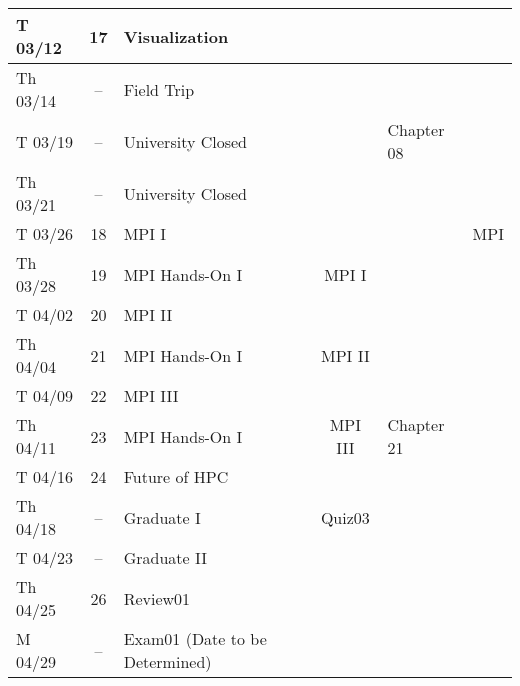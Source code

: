 \begin{center}
\begin{table}[h]
{\begin{tabular}{|l|c|l|c|l|l|}
 T 03/12 & 17 & Visualization &              &               &    \\ \hline
 Th 03/14 & -- & Field Trip &              &               &    \\ \hline
 T 03/19 & -- & University Closed  &              & Chapter 08    &    \\ \hline
 Th 03/21 & -- & University Closed    &              &               &    \\ \hline
 T 03/26 & 18 & MPI I &              &               & MPI   \\ \hline
 Th 03/28 & 19 & MPI Hands-On I & MPI I        &               &    \\ \hline
 T 04/02 & 20 & MPI II &              &               &    \\ \hline
 Th 04/04 & 21 & MPI Hands-On I & MPI II       &               &    \\ \hline
 T 04/09 & 22 & MPI III &              &               &    \\ \hline
 Th 04/11 & 23 & MPI Hands-On I & MPI III      & Chapter 21    &    \\ \hline
 T 04/16 & 24 & Future of HPC &              &               &    \\ \hline
 Th 04/18 & -- & Graduate I & Quiz03       &               &    \\ \hline
 T 04/23 & -- & Graduate II &              &               &    \\ \hline
 Th 04/25 & 26 & Review01 &         &               &    \\ \hline
 M 04/29 & -- & Exam01 (Date to be Determined) &              &  &    \\ \hline
\end{tabular}%
}\end{table}
\end{center}